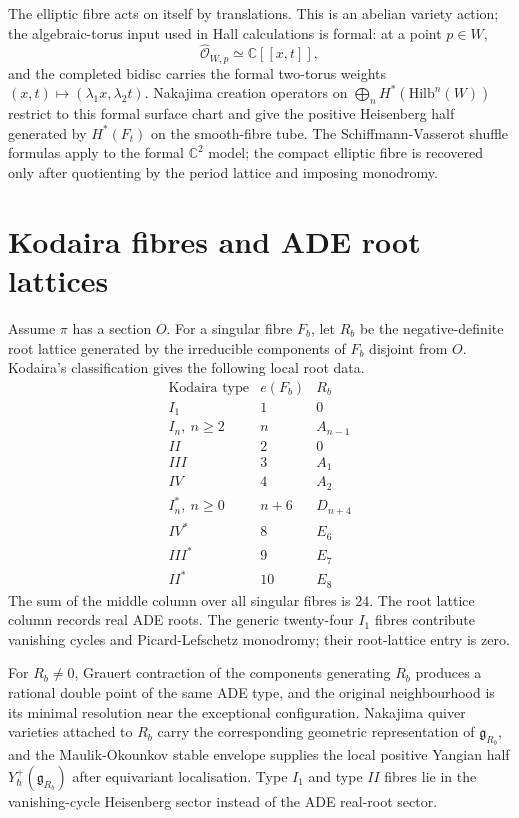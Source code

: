 \documentclass[11pt]{article}
\theoremstyle{plain}
\theoremstyle{definition}
\theoremstyle{remark}
\providecommand{\cO}{\mathcal{O}}
\providecommand{\CC}{\mathbb{C}}
\providecommand{\Ybold}{Y}
\providecommand{\frakg}{\mathfrak{g}}
\providecommand{\Hilb}{\mathrm{Hilb}}
\providecommand{\Root}{R}
\begin{document}
The elliptic fibre acts on itself by translations. This is an abelian
variety action; the algebraic-torus input used in Hall calculations is
formal: at a point
$p\in W$,
\[
 \widehat{\cO}_{W,p}\simeq \CC[[x,t]],
\]
and the completed bidisc carries the formal two-torus weights
$(x,t)\mapsto(\lambda_1x,\lambda_2t)$. Nakajima creation operators on
$\bigoplus_n H^*(\Hilb^n(W))$ restrict to this formal surface chart and
give the positive Heisenberg half generated by $H^*(F_t)$ on the
smooth-fibre tube. The Schiffmann-Vasserot shuffle formulas apply to
the formal $\CC^2$ model; the compact elliptic fibre is recovered only
after quotienting by the period lattice and imposing monodromy.

\section{Kodaira fibres and ADE root lattices}

Assume $\pi$ has a section $O$. For a singular fibre $F_b$, let
$\Root_b$ be the negative-definite root lattice generated by the
irreducible components of $F_b$ disjoint from $O$. Kodaira's
classification gives the following local root data.
\[
\begin{array}{c|c|c}
\text{Kodaira type} & e(F_b) & \Root_b \\
\hline
I_1 & 1 & 0 \\
I_n,\ n\geq 2 & n & A_{n-1} \\
II & 2 & 0 \\
III & 3 & A_1 \\
IV & 4 & A_2 \\
I_n^{*},\ n\geq 0 & n+6 & D_{n+4} \\
IV^{*} & 8 & E_6 \\
III^{*} & 9 & E_7 \\
II^{*} & 10 & E_8
\end{array}
\]
The sum of the middle column over all singular fibres is $24$.
The root lattice column records real ADE roots. The generic
twenty-four $I_1$ fibres contribute vanishing cycles and
Picard-Lefschetz monodromy; their root-lattice entry is zero.

For $\Root_b\neq 0$, Grauert contraction of the components generating
$\Root_b$ produces a rational double point of the same ADE type, and
the original neighbourhood is its minimal resolution near the
exceptional configuration. Nakajima quiver varieties attached to
$\Root_b$ carry the corresponding geometric representation of
$\frakg_{\Root_b}$, and the Maulik-Okounkov stable envelope supplies
the local positive Yangian half $\Ybold^+_\hbar(\frakg_{\Root_b})$
after equivariant localisation. Type $I_1$ and type $II$ fibres lie in
the vanishing-cycle Heisenberg sector instead of the ADE real-root
sector.
\end{document}
